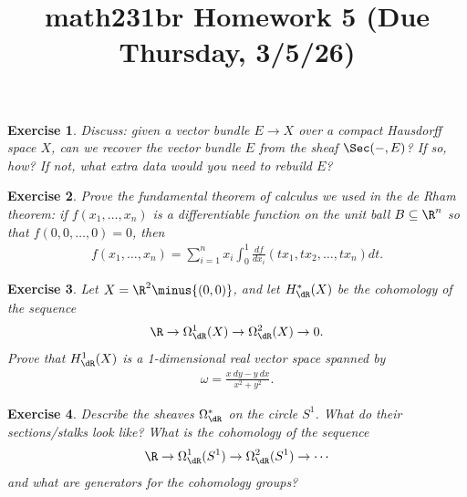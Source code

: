 \documentclass[11pt]{amsart}
\title{math231br Homework 5 (Due Thursday, 3/5/26)}
\newtheorem{hwexercise}{Exercise}
\begin{document}
\maketitle

\begin{hwexercise} Discuss: given a vector bundle $E \to X$ over a compact Hausdorff space $X$, can we recover the vector bundle $E$ from the sheaf $\Sec(-,E)$? If so, how? If not, what extra data would you need to rebuild $E$?
\end{hwexercise}


\begin{hwexercise} Prove the fundamental theorem of calculus we used in the de Rham theorem: if $f(x_1, \ldots, x_n)$ is a differentiable function on the unit ball $B \subseteq \R^n$ so that $f(0,0, \ldots, 0) = 0$, then
\begin{align*}
    f(x_1, \ldots, x_n) = \sum_{i=1}^n x_i\int_0^1 \frac{df}{dx_i}(tx_1,tx_2, \ldots, tx_n) dt.
\end{align*}
\end{hwexercise}

\begin{hwexercise}
Let $X = \R^2\minus\{(0,0)\}$, and let $H^\ast_\dR(X)$ be the cohomology of the sequence
\begin{align*}
    \R \to \Omega^1_\dR(X) \to \Omega^2_\dR(X) \to 0.
\end{align*}
Prove that $H^1_\dR(X)$ is a 1-dimensional real vector space spanned by
\begin{align*}
    \omega = \frac{x\ dy - y\ dx}{x^2+y^2}.
\end{align*}
\end{hwexercise}

\begin{hwexercise}
Describe the sheaves $\Omega^\ast_\dR$ on the circle $S^1$. What do their sections/stalks look like? What is the cohomology of the sequence
\begin{align*}
    \R \to \Omega^1_\dR(S^1) \to \Omega^2_\dR(S^1) \to \cdots
\end{align*}
and what are generators for the cohomology groups?
\end{hwexercise}
\end{document}
